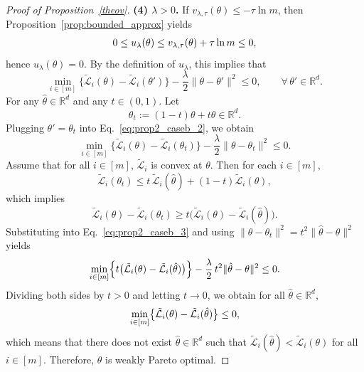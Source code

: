 \documentclass[sigconf]{acmart}
\begin{document}
\begin{proof}[Proof of Proposition~\ref{theov}]
\noindent\textbf{(4) $\lambda>0$.}
If $v_{\lambda,\tau}(\theta)\le -\tau\ln m$, then Proposition~\ref{prop:bounded_approx} yields
\begin{align}
0 \le u_{\lambda}(\theta) \le v_{\lambda,\tau}(\theta)+\tau\ln m \le 0\notag,
\end{align}
hence $u_{\lambda}(\theta)=0$. By the definition of $u_{\lambda}$, this implies that
\begin{equation}
\label{eq:prop2_caseb_2}
\min_{i\in[m]}
\bigl\{\tilde{\mathcal{L}}_i(\theta)-\tilde{\mathcal{L}}_i(\theta')\bigr\}
-\frac{\lambda}{2}\|\theta-\theta'\|^2
\le 0,
\qquad \forall\,\theta'\in \mathbb{R}^d.
\end{equation}
For any $\hat{\theta}\in \mathbb{R}^d$ and any $t\in(0,1)$. Let
\[
\theta_t := (1-t)\theta+t\hat{\theta} \in \mathbb{R}^d.
\]
Plugging $\theta'=\theta_t$ into Eq.~\eqref{eq:prop2_caseb_2}, we obtain
\begin{equation}
\label{eq:prop2_caseb_3}
\min_{i\in[m]} \bigl\{\tilde{\mathcal{L}}_i(\theta)-\tilde{\mathcal{L}}_i(\theta_t)\bigr\} -\frac{\lambda}{2}\|\theta-\theta_t\|^2 \le 0.
\end{equation}
Assume that for all $i\in[m]$, $\tilde{\mathcal{L}}_i$ is convex at $\theta$. Then for each $i\in[m]$,
\[
\tilde{\mathcal{L}}_i(\theta_t) \le t\,\tilde{\mathcal{L}}_i(\hat{\theta})+(1-t)\tilde{\mathcal{L}}_i(\theta),
\]
which implies
\[
\tilde{\mathcal{L}}_i(\theta)-\tilde{\mathcal{L}}_i(\theta_t) \ge t\bigl(\tilde{\mathcal{L}}_i(\theta)-\tilde{\mathcal{L}}_i(\hat{\theta})\bigr).
\]
Substituting into Eq.~\eqref{eq:prop2_caseb_3} and using $\|\theta-\theta_t\|^2=t^2\|\hat{\theta}-\theta\|^2$ yields
\begin{align}
\min_{i\in[m]}
\Bigl\{t\bigl(\tilde{\mathcal{L}}_i(\theta)-\tilde{\mathcal{L}}_i(\hat{\theta})\bigr)\Bigr\} -\frac{\lambda}{2}\,t^2\|\hat{\theta}-\theta\|^2 \le 0 \notag.
\end{align}
Dividing both sides by $t>0$ and letting $t\rightarrow 0$, we obtain for all $\hat{\theta}\in \mathbb{R}^d$,
\begin{align}
\min_{i\in[m]} \bigl\{\tilde{\mathcal{L}}_i(\theta)-\tilde{\mathcal{L}}_i(\hat{\theta})\bigr\} \le 0 \notag,
\end{align}
which means that there does not exist $\hat{\theta}\in \mathbb{R}^d$ such that $\tilde{\mathcal{L}}_i(\hat{\theta})<\tilde{\mathcal{L}}_i(\theta)$ for all $i\in[m]$. Therefore, $\theta$ is weakly Pareto optimal.
\end{proof}


\end{document}
